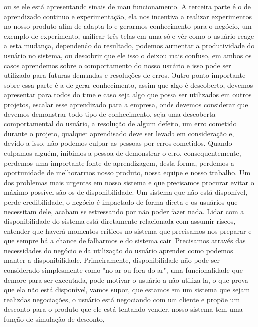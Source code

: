   ou se ele está apresentando sinais de mau funcionamento. A terceira parte é o
  de aprendizado continuo e experimentação, ela nos incentiva a realizar
  experimentos no nosso produto afim de adapta-lo e gerarmos conhecimento para o
  negócio, um exemplo de experimento, unificar três telas em uma só e vêr como o
  usuário reage a esta mudança, dependendo do resultado, podemos aumentar a
  produtividade do usuário no sistema, ou descobrir que ele isso o deixou mais
  confuso, em ambos os casos aprendemos sobre o comportamento do nosso usuário e
  isso pode ser utilizado para futuras demandas e resoluções de erros. Outro ponto
  importante sobre essa parte é a de gerar conhecimento, assim que algo é
  descoberto, devemos apresentar para todos do time e caso seja algo que possa
  ser utilizados em outros projetos, escalar esse aprendizado para a empresa,
  onde devemos considerar que devemos demonstrar todo tipo de conhecimento, seja
  uma descoberta comportamental do usuário, a resolução de algum defeito, um erro
  cometido durante o projeto, qualquer aprendisado deve ser levado em consideração
  e, devido a isso, não podemos culpar as pessoas por erros cometidos. Quando
  culpamos alguém, inibimos a pessoa de demonstrar o erro, consequentemente,
  perdemos uma importante fonte de aprendizagem, desta forma, perdemos a oportunidade
  de melhorarmos nosso produto, nossa equipe e nosso trabalho. \newline
  Um dos problemas mais urgentes em nosso sistema e que precisamos procurar evitar
  o máximo possível são os de disponibilidade. Um sistema que não está disponível,
  perde credibilidade, o negócio é impactado de forma direta e os usuários que
  necessitam dele, acabam se estressando por não poder fazer nada. Lidar com a
  disponibilidade do sistema está diretamente relacionada com assumir riscos,
  entender que haverá momentos críticos no sistema que precisamos nos preparar e
  que sempre há a chance de falharmos e do sistema cair. Precisamos através das
  necessidades do negócio e da utilização do usuário aprender como podemos manter
  a disponibilidade. Primeiramente, disponibilidade não pode ser considerado
  simplesmente como "no ar ou fora do ar", uma funcionalidade que demore para ser
  executada, pode motivar o usuário a não utiliza-la, o que prova que ela não está
  disponível, vamos supor, que estamos em um sistema que sejam realizdas negociações,
  o usuário está negociando com um cliente e propõe um desconto para o produto que
  ele está tentando vender, nosso sistema tem uma função de simulação de desconto,
